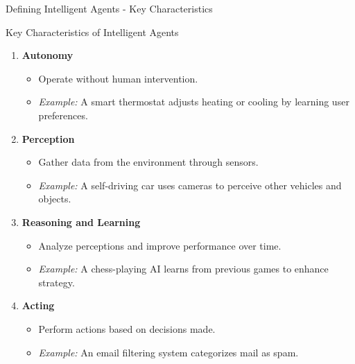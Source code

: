\documentclass[aspectratio=169]{beamer}
\begin{document}
\begin{frame}[fragile]{Defining Intelligent Agents - Key Characteristics}
    \begin{block}{Key Characteristics of Intelligent Agents}
        \begin{enumerate}
            \item \textbf{Autonomy}
                \begin{itemize}
                    \item Operate without human intervention.
                    \item \textit{Example:} A smart thermostat adjusts heating or cooling by learning user preferences.
                \end{itemize}
            \item \textbf{Perception}
                \begin{itemize}
                    \item Gather data from the environment through sensors.
                    \item \textit{Example:} A self-driving car uses cameras to perceive other vehicles and objects.
                \end{itemize}
            \item \textbf{Reasoning and Learning}
                \begin{itemize}
                    \item Analyze perceptions and improve performance over time.
                    \item \textit{Example:} A chess-playing AI learns from previous games to enhance strategy.
                \end{itemize}
            \item \textbf{Acting}
                \begin{itemize}
                    \item Perform actions based on decisions made.
                    \item \textit{Example:} An email filtering system categorizes mail as spam.
                \end{itemize}
        \end{enumerate}
    \end{block}
\end{frame}
\end{document}

